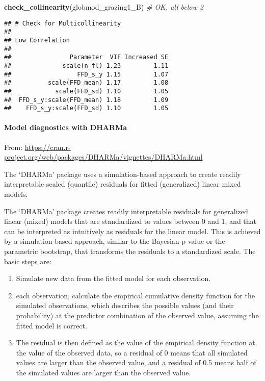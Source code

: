 \documentclass[
]{article}
\newenvironment{Shaded}{\begin{snugshade}}{\end{snugshade}}
\newcommand{\CommentTok}[1]{\textcolor[rgb]{0.56,0.35,0.01}{\textit{#1}}}
\newcommand{\KeywordTok}[1]{\textcolor[rgb]{0.13,0.29,0.53}{\textbf{#1}}}
\newcommand{\NormalTok}[1]{#1}
\begin{document}
\begin{Shaded}
\begin{Highlighting}[]
\KeywordTok{check_collinearity}\NormalTok{(globmod_grazing1_B) }\CommentTok{# OK, all below 2}
\end{Highlighting}
\end{Shaded}

\begin{verbatim}
## # Check for Multicollinearity
## 
## Low Correlation
## 
##                Parameter  VIF Increased SE
##              scale(n_fl) 1.23         1.11
##                  FFD_s_y 1.15         1.07
##          scale(FFD_mean) 1.17         1.08
##            scale(FFD_sd) 1.10         1.05
##  FFD_s_y:scale(FFD_mean) 1.18         1.09
##    FFD_s_y:scale(FFD_sd) 1.10         1.05
\end{verbatim}

\hypertarget{model-diagnostics-with-dharma}{%
\paragraph{Model diagnostics with
DHARMa}\label{model-diagnostics-with-dharma}}

From:
\url{https://cran.r-project.org/web/packages/DHARMa/vignettes/DHARMa.html}

The `DHARMa' package uses a simulation-based approach to create readily
interpretable scaled (quantile) residuals for fitted (generalized)
linear mixed models.

The `DHARMa' package creates readily interpretable residuals for
generalized linear (mixed) models that are standardized to values
between 0 and 1, and that can be interpreted as intuitively as residuals
for the linear model. This is achieved by a simulation-based approach,
similar to the Bayesian p-value or the parametric bootstrap, that
transforms the residuals to a standardized scale. The basic steps are:

\begin{enumerate}
\def\labelenumi{\arabic{enumi}.}
\item
  Simulate new data from the fitted model for each observation.
\item
  each observation, calculate the empirical cumulative density function
  for the simulated observations, which describes the possible values
  (and their probability) at the predictor combination of the observed
  value, assuming the fitted model is correct.
\item
  The residual is then defined as the value of the empirical density
  function at the value of the observed data, so a residual of 0 means
  that all simulated values are larger than the observed value, and a
  residual of 0.5 means half of the simulated values are larger than the
  observed value.
\end{enumerate}
\end{document}
